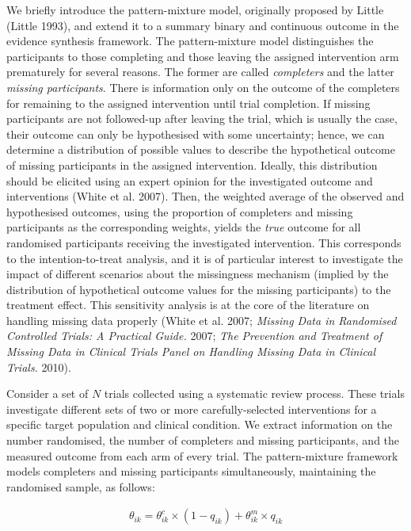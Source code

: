 We briefly introduce the pattern-mixture model, originally proposed by Little
(Little 1993), and extend it to a summary binary and continuous outcome in the
evidence synthesis framework. The pattern-mixture model distinguishes the participants
to those completing and those leaving the assigned intervention arm prematurely
for several reasons. The former are called \emph{completers} and the latter
\emph{missing participants}. There is information only on the outcome of the completers
for remaining to the assigned intervention until trial completion. If missing
participants are not followed-up after leaving the trial, which is usually the case,
their outcome can only be hypothesised with some uncertainty; hence, we can determine
a distribution of possible values to describe the hypothetical outcome of missing
participants in the assigned intervention. Ideally, this distribution should be elicited
using an expert opinion for the investigated outcome and interventions (White et al. 2007).
Then, the weighted average of the observed and hypothesised outcomes, using the
proportion of completers and missing participants as the corresponding weights,
yields the \emph{true} outcome for all randomised participants receiving the investigated
intervention. This corresponds to the intention-to-treat analysis, and it is of
particular interest to investigate the impact of different scenarios about the
missingness mechanism (implied by the distribution of hypothetical outcome
values for the missing participants) to the treatment effect. This sensitivity
analysis is at the core of the literature on handling missing data properly
(White et al. 2007; \emph{Missing Data in Randomised Controlled Trials: A Practical Guide.} 2007; \emph{The Prevention and Treatment of Missing Data in Clinical Trials Panel on Handling Missing Data in Clinical Trials.} 2010).

Consider a set of \(N\) trials collected using a systematic review process. These
trials investigate different sets of two or more carefully-selected interventions
for a specific target population and clinical condition. We extract information on
the number randomised, the number of completers and missing participants, and the
measured outcome from each arm of every trial. The pattern-mixture framework models
completers and missing participants simultaneously, maintaining the randomised
sample, as follows:

\[\begin{aligned}
\theta_{ik} = \theta^{c}_{ik} \times (1 - q_{ik}) + \theta^{m}_{ik} \times q_{ik}
\end{aligned}\]

